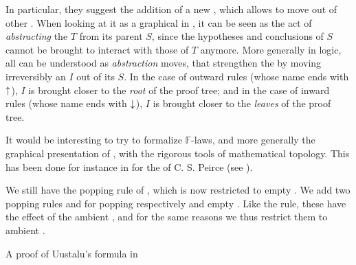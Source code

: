 \begin{description}
  In particular, they suggest the addition of a new 
  , which allows to move   out of other
   . When looking at it as a graphical  in
  , it can be seen as the act of \emph{abstracting} the
   $T$ from its parent  $S$, since the hypotheses and
  conclusions of $S$ cannot be brought to interact with those of $T$ anymore.
  More generally in  logic, all  can be
  understood as \emph{abstraction} moves, that strengthen the  by
  moving irreversibly an  $I$ out of its  $S$. In the case
  of outward rules (whose name ends with $\uparrow$), $I$ is brought closer to the
  \emph{root} of the proof tree; and in the case of inward rules (whose name
  ends with $\downarrow$), $I$ is brought closer to the \emph{leaves} of the proof
  tree.
  
  It would be interesting to try to formalize $\mathbb{F}$-laws, and more
  generally the graphical presentation of , with the rigorous tools
  of mathematical topology. This has been done for instance in
   for the  of C. S.
  Peirce (see ).

  \item[\membrane] 
  We still have the popping rule  of , which is now restricted to
   empty . We add two popping rules  and  for
  popping respectively  and   empty . Like the
   rule, these have the effect of  the ambient
  , and for the same reasons we thus restrict them to  ambient
  .

  \begin{marginfigure}
    
    \caption{A proof of Uustalu's formula in }
  \end{marginfigure}


\end{description}
